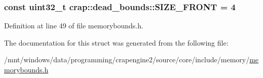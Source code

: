 \subsubsection[{S\+I\+Z\+E\+\_\+\+F\+R\+O\+N\+T}]{\setlength{\rightskip}{0pt plus 5cm}const uint32\+\_\+t crap\+::dead\+\_\+bounds\+::\+S\+I\+Z\+E\+\_\+\+F\+R\+O\+N\+T = 4\hspace{0.3cm}{\ttfamily [static]}}\label{structcrap_1_1dead__bounds_aacd105207fa9af97704d416ff4580807}


Definition at line 49 of file memorybounds.\+h.



The documentation for this struct was generated from the following file\+:\begin{DoxyCompactItemize}
\item 
/mnt/windows/data/programming/crapengine2/source/core/include/memory/\hyperlink{memorybounds_8h}{memorybounds.\+h}\end{DoxyCompactItemize}
